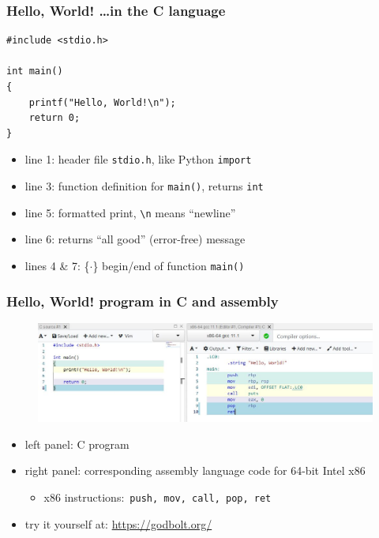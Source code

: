 \documentclass[english,14pt]{beamer}
\begin{document}
\begin{frame}[fragile]

\frametitle{Hello, World!  \ldots in the C language}

\begin{lstlisting}[style=CStyle,basicstyle=\small]
#include <stdio.h>

int main()
{
    printf("Hello, World!\n");
    return 0;
}
\end{lstlisting}

\begin{itemize}
	\item line 1: header file \texttt{stdio.h}, like Python \texttt{import}
	\item line 3: function definition for \texttt{main()}, returns \texttt{int}
	\item line 5: formatted print, \verb+\n+ means ``newline''
	\item line 6: returns ``all good'' (error-free) message
	\item lines 4 \& 7: \{$\cdot$\} begin/end of function \texttt{main()}
\end{itemize}

\end{frame}


\begin{frame}[fragile]

\frametitle{Hello, World! program in C and assembly}

\begin{figure}[ht]
	\centering
	\includegraphics[width=\textwidth]{figures/Cvsx86assembly}
\end{figure}

\begin{itemize}
	\item left panel: C program
	\item right panel: corresponding assembly language code for 64-bit Intel x86
	\begin{itemize}
		\item x86 instructions:~\texttt{push, mov, call, pop, ret}
	\end{itemize}
	\item try it yourself at: \href{https://godbolt.org/}{https://godbolt.org/}
\end{itemize}

\end{frame}
\end{document}
